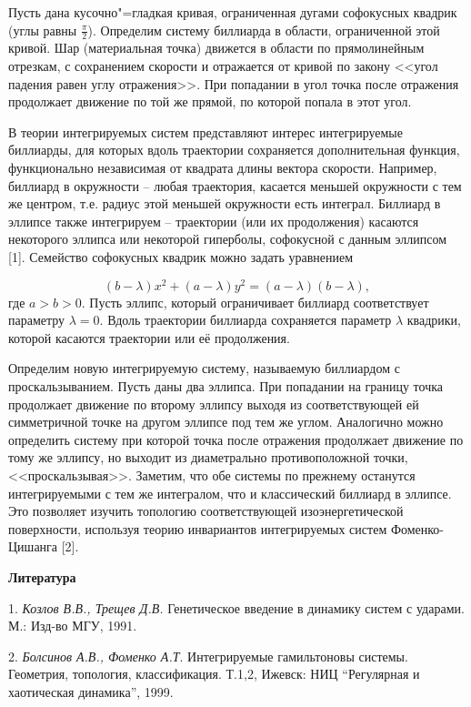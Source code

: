 
\vzmscaption

Пусть дана кусочно"=гладкая кривая, ограниченная дугами софокусных квадрик (углы равны $\frac{\pi}{2}$). Определим систему биллиарда в области, ограниченной этой кривой. Шар (материальная точка) движется в области по прямолинейным отрезкам, с сохранением скорости и отражается от кривой по закону <<угол падения равен углу отражения>>. При попадании в угол точка после отражения продолжает движение по той же прямой, по которой попала в этот угол.

В теории интегрируемых систем представляют интерес интегрируемые биллиарды, для которых вдоль траектории сохраняется дополнительная функция, функционально независимая от квадрата длины вектора скорости. Например, биллиард в окружности – любая траектория, касается меньшей окружности с тем же центром, т.е. радиус этой меньшей окружности есть интеграл. Биллиард в эллипсе также интегрируем – траектории (или их продолжения) касаются некоторого эллипса или некоторой гиперболы, софокусной с данным эллипсом [1].
Семейство софокусных квадрик можно задать уравнением

$$(b-\lambda)x^2+(a-\lambda)y^2=(a-\lambda)(b-\lambda),$$
где $a>b>0.$ Пусть эллипс, который ограничивает биллиард соответствует параметру $\lambda=0.$ Вдоль траектории биллиарда сохраняется параметр $\lambda$ квадрики, которой касаются траектории или её продолжения.

Определим новую интегрируемую систему, называемую биллиардом с проскальзыванием. Пусть даны два эллипса. При попадании на границу точка продолжает движение по второму эллипсу выходя из соответствующей ей симметричной точке на другом эллипсе под тем же углом. Аналогично можно определить систему при которой точка после отражения продолжает движение по тому же эллипсу, но выходит из диаметрально противоположной точки, <<проскальзывая>>. Заметим, что обе системы по прежнему останутся интегрируемыми с тем же интегралом, что и классический биллиард в эллипсе. Это позволяет изучить топологию соответствующей изоэнергетической поверхности, используя теорию инвариантов интегрируемых систем Фоменко-Цишанга [2].



\smallskip \centerline {\bf Литература} \nopagebreak

1. {\it Козлов В.В., Трещев Д.В.} Генетическое введение в динамику систем с ударами. М.: Изд-во МГУ, 1991.

2. {\it Болсинов А.В., Фоменко А.Т}. Интегрируемые гамильтоновы системы. Геометрия, топология, классификация. Т.1,2, Ижевск: НИЦ “Регулярная и хаотическая динамика”, 1999.

